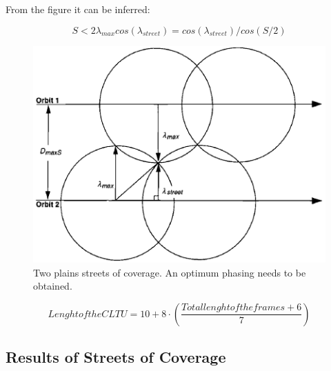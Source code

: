 From the figure it can be inferred:

\begin{equation}
S < 2\lambda_{max}
cos(\lambda_{street}) = cos(\lambda_{street})/cos(S/2)
\end{equation}

\begin{figure}[H]
\begin{center}
\includegraphics[scale=0.7]{PolarOrbits/planeseps.png}
\caption{Two plains streets of coverage. An optimum phasing needs to be obtained.}
\end{center}
\end{figure}

\begin{equation}
Lenght of the CLTU=10+8\cdot(\frac{Total lenght of the frames+6}{7})
\end{equation} 


\subsection{Results of Streets of Coverage}


